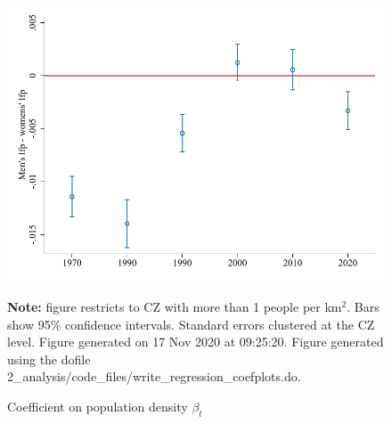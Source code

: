 \begin{figure}[!h]
\centering
\caption{Coefficient on population density $ \beta_t $}
\includegraphics[width=1\textwidth]{../2_analysis/output/figures/lfp_gap_full_time}
\par \begin{minipage}[h]{\textwidth}{\tiny\textbf{Note:} figure restricts to CZ with more than 1 people per km$^2$. Bars show 95\% confidence intervals. Standard errors clustered at the CZ level. Figure generated on 17 Nov 2020 at 09:25:20. Figure generated using the dofile 2\_analysis/code\_files/write\_regression\_coefplots.do.}\end{minipage}
\end{figure}
